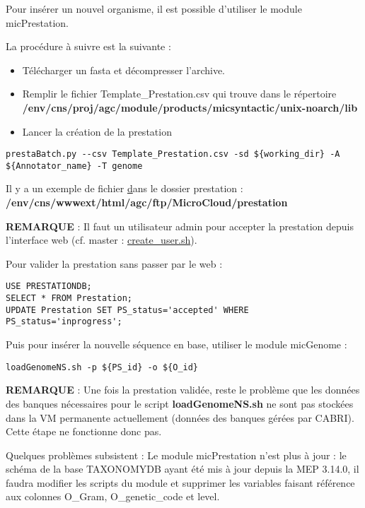 Pour insérer un nouvel organisme, il est possible d’utiliser le module micPrestation.

La procédure à suivre est la suivante :
\begin{itemize}
    \item Télécharger un fasta et décompresser l'archive.
    \item Remplir le fichier Template\_Prestation.csv qui trouve dans le répertoire \textbf{/env/cns/proj/agc/module/products/micsyntactic/unix-noarch/lib}
    \item Lancer la création de la prestation
\end{itemize}

\begin{lstlisting}[style=bash]
prestaBatch.py --csv Template_Prestation.csv -sd ${working_dir} -A ${Annotator_name} -T genome
\end{lstlisting}
Il y a un exemple de fichier \href{Template\_Prestation.csv} dans le dossier prestation : \textbf{/env/cns/wwwext/html/agc/ftp/MicroCloud/prestation}
\newline
\begin{mycolorbox}\textbf{REMARQUE} : Il faut un utilisateur admin pour accepter la prestation depuis l'interface web (cf. master : \href{https://github.com/IFB-ElixirFr/biosphere-microcloud/blob/master/master/create_user.sh}{create\_user.sh}).
\end{mycolorbox}
\bigskip

Pour valider la prestation sans passer par le web :
\begin{lstlisting}[style=SQL]
USE PRESTATIONDB;
SELECT * FROM Prestation;
UPDATE Prestation SET PS_status='accepted' WHERE PS_status='inprogress';
\end{lstlisting}
\bigskip
Puis pour insérer la nouvelle séquence en base, utiliser le module micGenome :
\begin{lstlisting}[style=bash]
loadGenomeNS.sh -p ${PS_id} -o ${O_id}
\end{lstlisting}

\begin{mycolorbox}\textbf{REMARQUE} : Une fois la prestation validée, reste le problème que les données des banques nécessaires pour le script \textbf{loadGenomeNS.sh} ne sont pas stockées dans la VM permanente actuellement (données des banques gérées par CABRI). Cette étape ne fonctionne donc pas.
\end{mycolorbox}

Quelques problèmes subsistent :
Le module micPrestation n'est plus à jour : le schéma de la base TAXONOMYDB ayant été mis à jour depuis la MEP 3.14.0, il faudra modifier les scripts du module et supprimer les variables faisant référence aux colonnes O\_Gram, O\_genetic\_code et level.
\newline

